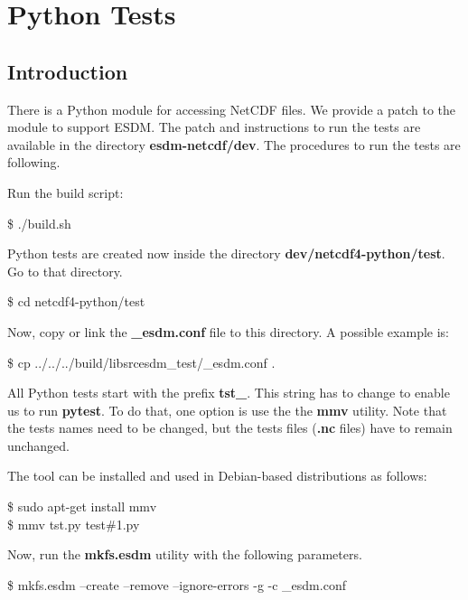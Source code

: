 \chapter{Python Tests}
\label{ch:python}

\section{Introduction}

\tab
There is a Python module for accessing NetCDF files.
We provide a patch to the module to support ESDM.
The patch and instructions to run the tests are available in the directory \textbf{esdm-netcdf/dev}.
The procedures to run the tests are following.

Run the build script:

\begin{framed}
\$ ./build.sh
\end{framed}

Python tests are created now inside the directory \textbf{dev/netcdf4-python/test}. Go to that directory.

\begin{framed}
\$ cd netcdf4-python/test
\end{framed}

Now, copy or link the \textbf{\_esdm.conf} file to this directory. A possible example is:

\begin{framed}
\$ cp ../../../build/libsrcesdm\_test/\_esdm.conf .
\end{framed}

All Python tests start with the prefix \textbf{tst\_}.
This string has to change to enable us to run \textbf{pytest}. To do that, one option is use the the \textbf{mmv} utility. Note that the tests names need to be changed, but the tests files (\textbf{.nc} files) have to remain unchanged.

The tool can be installed and used in Debian-based distributions as follows:

\begin{framed}
\$ sudo apt-get install mmv\\
\$ mmv tst\*.py test\#1.py
\end{framed}

Now, run the \textbf{mkfs.esdm} utility with the following parameters.

\begin{framed}
\$ mkfs.esdm --create --remove --ignore-errors -g -c \_esdm.conf
\end{framed}

